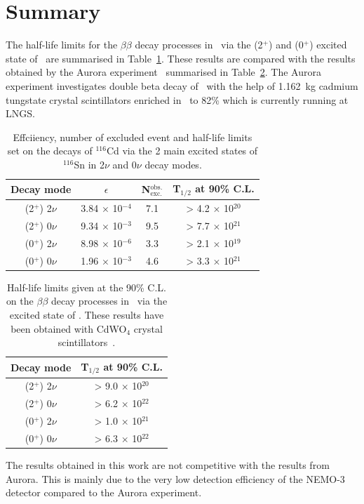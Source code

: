 \documentclass[main.tex]{subfiles}
\begin{document}
\FloatBarrier


\section{Summary}\label{sec:SummaryAnalysis}


\NI The half-life limits for the $\beta\beta$ decay processes in \Cd ~via the (2$^+$) and (0$^+$) excited state of \Sn ~are summarised in Table~\ref{tab:SummaryResultsAnalysis}. These results are compared with the results obtained by the Aurora experiment~\cite{Aurora} summarised in Table~\ref{tab:AuroraResults}. The Aurora experiment investigates double beta decay of \Cd ~with the help of 1.162~kg cadmium tungstate crystal scintillators enriched in \Cd ~to 82\% which is currently running at LNGS.



\begin{table}[h!]
\centering
\begin{tabular}{c|c|c|c}
Decay mode & $\epsilon$ & N$_{\text{exc.}}^{\text{obs.}}$ & T$_{\text{1/2}}$ at 90\% C.L. \\
\toprule
(2$^+$) 2$\nu$ & 3.84 $\times$ 10$^{-\text{4}}$ & 7.1 & > 4.2 $\times$ 10$^{\text{20}}$ \\[0.2cm]
(2$^+$) 0$\nu$ & 9.34 $\times$ 10$^{-\text{3}}$ & 9.5 & > 7.7 $\times$ 10$^{\text{21}}$ \\[0.2cm]
\hline
(0$^+$) 2$\nu$ & 8.98 $\times$ 10$^{-\text{6}}$ & 3.3 & > 2.1 $\times$ 10$^{\text{19}}$ \\[0.2cm]
(0$^+$) 0$\nu$ & 1.96 $\times$ 10$^{-\text{3}}$ & 4.6 & > 3.3 $\times$ 10$^{\text{21}}$ \\[0.2cm]
\bottomrule
\end{tabular}
\caption{Effciiency, number of excluded event and half-life limits set on the decays of $^{\text{116}}$Cd via the 2 main excited states of $^{\text{116}}$Sn in 2$\nu$ and 0$\nu$ decay modes.}
\label{tab:SummaryResultsAnalysis}
\end{table}


\begin{table}[h!]
\centering
\begin{tabular}{c|c}
Decay mode & T$_{\text{1/2}}$ at 90\% C.L. \\
\toprule
(2$^+$) 2$\nu$ & > 9.0 $\times$ 10$^{\text{20}}$ \\[0.2cm]
(2$^+$) 0$\nu$ & > 6.2 $\times$ 10$^{\text{22}}$ \\[0.2cm]
\hline
(0$^+$) 2$\nu$ & > 1.0 $\times$ 10$^{\text{21}}$ \\[0.2cm]
(0$^+$) 0$\nu$ & > 6.3 $\times$ 10$^{\text{22}}$ \\[0.2cm]
\bottomrule
\end{tabular}
\caption{Half-life limits given at the 90\% C.L. on the $\beta\beta$ decay processes in \Cd ~via the excited state of \Sn. These results have been obtained with CdWO$_\text{4}$ crystal scintillators~\cite{Aurora}.}
\label{tab:AuroraResults}
\end{table}


\NI The results obtained in this work are not competitive with the results from Aurora. This is mainly due to the very low detection efficiency of the NEMO-3 detector compared to the Aurora experiment.
\end{document}
